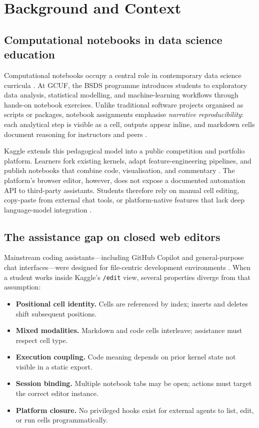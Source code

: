 \section{Background and Context}
\label{sec:background}

\subsection{Computational notebooks in data science education}

Computational notebooks occupy a central role in contemporary data science curricula \parencite{kluyver2016jupyter,perez2007ipython}. At \acf{GCUF}, the \acf{BSDS} programme introduces students to exploratory data analysis, statistical modelling, and machine-learning workflows through hands-on notebook exercises. Unlike traditional software projects organised as scripts or packages, notebook assignments emphasise \emph{narrative reproducibility}: each analytical step is visible as a cell, outputs appear inline, and markdown cells document reasoning for instructors and peers \parencite{rule2019tenrules}.

Kaggle extends this pedagogical model into a public competition and portfolio platform. Learners fork existing kernels, adapt feature-engineering pipelines, and publish notebooks that combine code, visualisation, and commentary \parencite{quaranta2021kgtorrent,wang2021welldocumented}. The platform's browser editor, however, does not expose a documented automation \ac{API} to third-party assistants. Students therefore rely on manual cell editing, copy-paste from external chat tools, or platform-native features that lack deep language-model integration \parencite{mcnutt2023notebookassistants}.

\subsection{The assistance gap on closed web editors}

Mainstream coding assistants---including GitHub Copilot and general-purpose chat interfaces---were designed for file-centric development environments \parencite{ziegler2024copilot,chen2021codex}. When a student works inside Kaggle's \texttt{/edit} view, several properties diverge from that assumption:

\begin{itemize}
  \item \textbf{Positional cell identity.} Cells are referenced by index; inserts and deletes shift subsequent positions.
  \item \textbf{Mixed modalities.} Markdown and code cells interleave; assistance must respect cell type.
  \item \textbf{Execution coupling.} Code meaning depends on prior kernel state not visible in a static export.
  \item \textbf{Session binding.} Multiple notebook tabs may be open; actions must target the correct editor instance.
  \item \textbf{Platform closure.} No privileged hooks exist for external agents to list, edit, or run cells programmatically.
\end{itemize}

